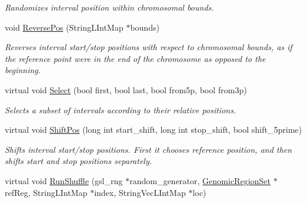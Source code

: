 \begin{CompactItemize}
\begin{CompactList}\small\item\em Randomizes interval position within chromosomal bounds. \item\end{CompactList}\item 
\hypertarget{classGenomicRegion_6120af435fb9ee68cb5a3d5066a4fda4}{
void \hyperlink{classGenomicRegion_6120af435fb9ee68cb5a3d5066a4fda4}{ReversePos} (StringLIntMap $\ast$bounds)}
\label{classGenomicRegion_6120af435fb9ee68cb5a3d5066a4fda4}

\begin{CompactList}\small\item\em Reverses interval start/stop positions with respect to chromosomal bounds, as if the reference point were in the end of the chromosome as opposed to the beginning. \item\end{CompactList}\item 
\hypertarget{classGenomicRegion_461fbb00db1b45061e641f37614fb146}{
virtual void \hyperlink{classGenomicRegion_461fbb00db1b45061e641f37614fb146}{Select} (bool first, bool last, bool from5p, bool from3p)}
\label{classGenomicRegion_461fbb00db1b45061e641f37614fb146}

\begin{CompactList}\small\item\em Selects a subset of intervals according to their relative positions. \item\end{CompactList}\item 
virtual void \hyperlink{classGenomicRegion_dc42fea61283fa8134d65467b2292405}{ShiftPos} (long int start\_\-shift, long int stop\_\-shift, bool shift\_\-5prime)
\begin{CompactList}\small\item\em Shifts interval start/stop positions. First it chooses reference position, and then shifts start and stop positions separately. \item\end{CompactList}\item 
\hypertarget{classGenomicRegion_b2c52ae40b34f3607f4558add94c25fd}{
virtual void \hyperlink{classGenomicRegion_b2c52ae40b34f3607f4558add94c25fd}{RunShuffle} (gsl\_\-rng $\ast$random\_\-generator, \hyperlink{classGenomicRegionSet}{GenomicRegionSet} $\ast$refReg, StringLIntMap $\ast$index, StringVecLIntMap $\ast$loc)}
\label{classGenomicRegion_b2c52ae40b34f3607f4558add94c25fd}


\end{CompactItemize}
